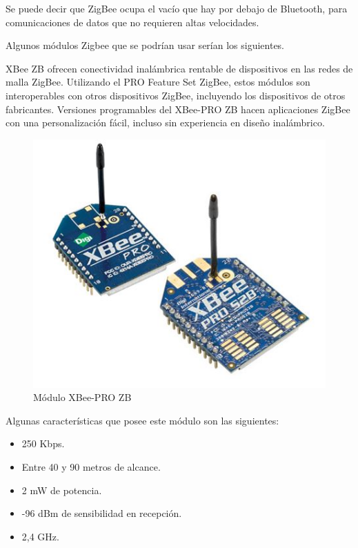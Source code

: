 				Se puede decir que ZigBee ocupa el vacío que hay por debajo de Bluetooth, para comunicaciones de datos que no requieren altas velocidades.
				
				Algunos módulos Zigbee que se podrían usar serían los siguientes.
				
				XBee ZB \cite{xbeeZD} ofrecen conectividad inalámbrica rentable de dispositivos en las redes de malla ZigBee. Utilizando el PRO Feature Set ZigBee, estos módulos son interoperables con otros dispositivos ZigBee, incluyendo los dispositivos de otros fabricantes. Versiones programables del XBee-PRO ZB hacen aplicaciones ZigBee con una personalización fácil, incluso sin experiencia en diseño inalámbrico.
				
				\begin{figure}[h]
					\centering
					\includegraphics{imagenes/XBEEZD.JPG}
					\caption{Módulo XBee-PRO ZB}
					\label{contexto:figura}
				\end{figure}
				
				Algunas características que posee este módulo son las siguientes:
				
				\begin{itemize}
					\item 250 Kbps.
					\item Entre 40 y 90 metros de alcance.
					\item 2 mW de potencia.
					\item -96 dBm de sensibilidad en recepción.
					\item 2,4 GHz.
				\end{itemize}
				
